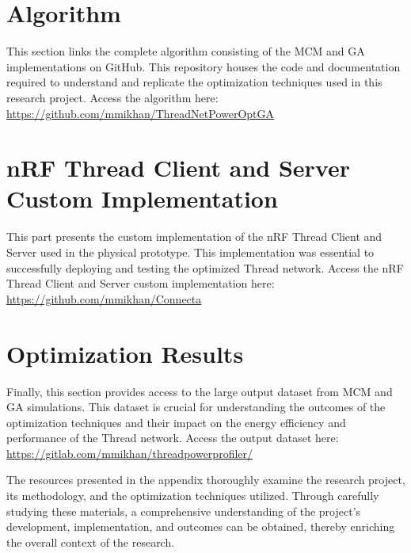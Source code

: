 \section{Algorithm}
This section links the complete algorithm consisting of the \gls{MCM} and \gls{GA} implementations on GitHub. This repository houses the code and documentation required to understand and replicate the optimization techniques used in this research project. Access the algorithm here: \url{https://github.com/mmikhan/ThreadNetPowerOptGA}

\section{nRF Thread Client and Server Custom Implementation}
This part presents the custom implementation of the \gls{nRF} Thread Client and Server used in the physical prototype. This implementation was essential to successfully deploying and testing the optimized Thread network. Access the \gls{nRF} Thread Client and Server custom implementation here: \url{https://github.com/mmikhan/Connecta}

\section{Optimization Results}
Finally, this section provides access to the large output dataset from \gls{MCM} and \gls{GA} simulations. This dataset is crucial for understanding the outcomes of the optimization techniques and their impact on the energy efficiency and performance of the Thread network. Access the output dataset here: \url{https://gitlab.com/mmikhan/threadpowerprofiler/}

\vspace{2mm}
The resources presented in the appendix thoroughly examine the research project, its methodology, and the optimization techniques utilized. Through carefully studying these materials, a comprehensive understanding of the project's development, implementation, and outcomes can be obtained, thereby enriching the overall context of the research.


